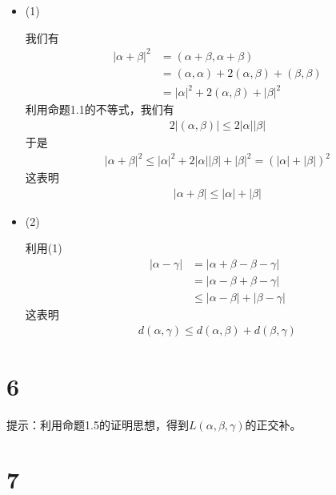 \documentclass{article}
\begin{document}
\begin{itemize}
  \item (1)

        我们有
        \begin{align*}
          |\alpha + \beta|^2 & = (\alpha+\beta, \alpha+\beta)                         \\
                             & = (\alpha, \alpha) + 2(\alpha, \beta) + (\beta, \beta) \\
                             & = |\alpha|^2 + 2(\alpha, \beta) + |\beta|^2
        \end{align*}
        利用命题1.1的不等式，我们有
        \begin{align*}
          2|(\alpha, \beta)| \leq 2|\alpha| |\beta|
        \end{align*}
        于是
        \begin{align*}
          |\alpha + \beta|^2 \leq |\alpha|^2 + 2|\alpha| |\beta| + |\beta|^2 = (|\alpha| + |\beta|)^2
        \end{align*}
        这表明
        \begin{align*}
          |\alpha + \beta| \leq |\alpha| + |\beta|
        \end{align*}

  \item (2)

        利用(1)
        \begin{align*}
          |\alpha - \gamma| & = |\alpha + \beta - \beta - \gamma|      \\
                            & = |\alpha - \beta + \beta - \gamma|      \\
                            & \leq |\alpha - \beta| + |\beta - \gamma|
        \end{align*}
        这表明
        \begin{align*}
          d(\alpha, \gamma) \leq d(\alpha, \beta) + d(\beta, \gamma)
        \end{align*}
\end{itemize}

\section*{6}

提示：利用命题1.5的证明思想，得到$L(\alpha, \beta, \gamma)$的正交补。

\section*{7}
\end{document}
